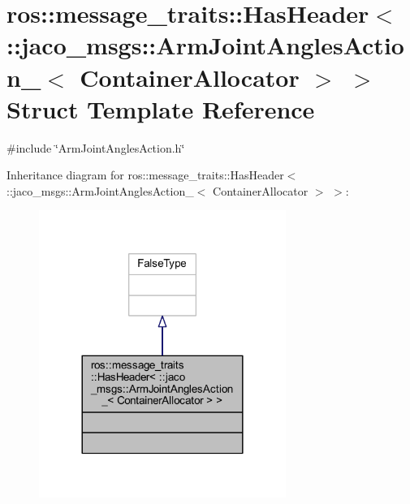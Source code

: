 \hypertarget{structros_1_1message__traits_1_1HasHeader_3_01_1_1jaco__msgs_1_1ArmJointAnglesAction___3_01ContainerAllocator_01_4_01_4}{}\section{ros\+:\+:message\+\_\+traits\+:\+:Has\+Header$<$ \+:\+:jaco\+\_\+msgs\+:\+:Arm\+Joint\+Angles\+Action\+\_\+$<$ Container\+Allocator $>$ $>$ Struct Template Reference}
\label{structros_1_1message__traits_1_1HasHeader_3_01_1_1jaco__msgs_1_1ArmJointAnglesAction___3_01ContainerAllocator_01_4_01_4}


{\ttfamily \#include \char`\"{}Arm\+Joint\+Angles\+Action.\+h\char`\"{}}



Inheritance diagram for ros\+:\+:message\+\_\+traits\+:\+:Has\+Header$<$ \+:\+:jaco\+\_\+msgs\+:\+:Arm\+Joint\+Angles\+Action\+\_\+$<$ Container\+Allocator $>$ $>$\+:
\nopagebreak
\begin{figure}[H]
\begin{center}
\leavevmode
\includegraphics[width=228pt]{d8/d34/structros_1_1message__traits_1_1HasHeader_3_01_1_1jaco__msgs_1_1ArmJointAnglesAction___3_01Conta4b28ce65152096e4b37e644b2bea6e2a}
\end{center}
\end{figure}



